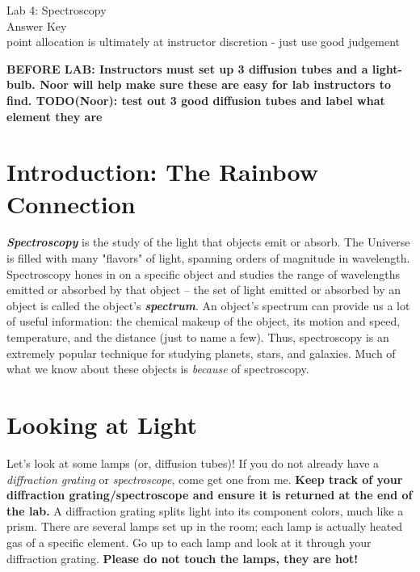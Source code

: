 \documentclass[11pt]{article}
\begin{document}
\begin{center}
\huge{Lab 4: Spectroscopy}\\[4pt]
\Large Answer Key
\\ \small point allocation is ultimately at instructor discretion - just use good judgement
\end{center}

\medskip
\textbf{ BEFORE LAB: Instructors must set up 3 diffusion tubes and a light-bulb. Noor will help make sure these are easy for lab instructors to find. TODO(Noor): test out 3 good diffusion tubes and label what element they are}

\section{Introduction: The Rainbow Connection}

\textbf{\emph{Spectroscopy}} is the study of the light that objects emit or absorb. The Universe is filled with many "flavors" of light, spanning orders of magnitude in wavelength. Spectroscopy hones in on a specific object and studies the range of wavelengths emitted or absorbed by that object -- the set of light emitted or absorbed by an object is called the object's \textbf{\emph{spectrum}}. An object's spectrum can provide us a lot of useful information: the chemical makeup of the object, its motion and speed, temperature, and the distance (just to name a few). Thus, spectroscopy is an extremely popular technique for studying planets, stars, and galaxies. Much of what we know about these objects is \emph{because} of spectroscopy.

\section{Looking at Light}

Let's look at some lamps (or, diffusion tubes)! If you do not already have a \emph{diffraction grating} or \emph{spectroscope}, come get one from me. \textbf{Keep track of your diffraction grating/spectroscope and ensure it is returned at the end of the lab.} A diffraction grating splits light into its component colors, much like a prism. There are several lamps set up in the room; each lamp is actually heated gas of a specific element. Go up to each lamp and look at it through your diffraction grating. \textbf{Please do not touch the lamps, they are hot!} \\
\end{document}
